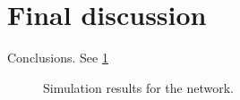 \section{Final discussion}
\label{sec:final_discussion}

Conclusions. See \cref{fig:the_graph}

\begin{figure}[!t]
    \centering
    
    \caption{Simulation results for the network.}
    \label{fig:the_graph}
\end{figure}
